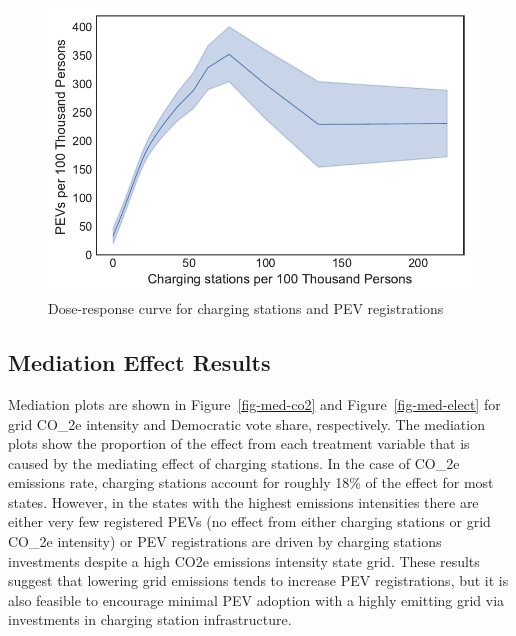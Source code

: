 \documentclass[
  letterpaper,
  DIV=11,
  numbers=noendperiod]{scrartcl}
\begin{document}
\begin{figure}

{\centering \includegraphics{TRB_2023_files/figure-pdf/fig-dose-response-output-1.pdf}

}

\caption{\label{fig-dose-response}Dose-response curve for charging
stations and PEV registrations}

\end{figure}

\hypertarget{mediation-effect-results}{%
\subsection{Mediation Effect Results}\label{mediation-effect-results}}

Mediation plots are shown in Figure~\ref{fig-med-co2} and
Figure~\ref{fig-med-elect} for grid CO\_2e intensity and Democratic vote
share, respectively. The mediation plots show the proportion of the
effect from each treatment variable that is caused by the mediating
effect of charging stations. In the case of CO\_2e emissions rate,
charging stations account for roughly 18\% of the effect for most
states. However, in the states with the highest emissions intensities
there are either very few registered PEVs (no effect from either
charging stations or grid CO\_2e intensity) or PEV registrations are
driven by charging stations investments despite a high CO2e emissions
intensity state grid. These results suggest that lowering grid emissions
tends to increase PEV registrations, but it is also feasible to
encourage minimal PEV adoption with a highly emitting grid via
investments in charging station infrastructure.
\end{document}
